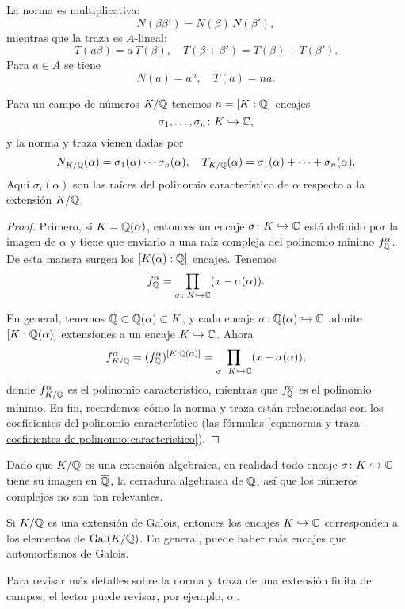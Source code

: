 La norma es multiplicativa:
$$N (\beta \beta') = N (\beta)\,N(\beta'),$$
mientras que la traza es $A$-lineal:
\[ T (a \beta) = a \, T (\beta), \quad
   T (\beta+\beta') = T (\beta) + T (\beta'). \]
Para $a \in A$ se tiene
$$N (a) = a^n, \quad T (a) = na.$$

\begin{proposicion}
  Para un campo de números $K/\mathbb{Q}$ tenemos $n = [K : \mathbb{Q}]$ encajes
  $$\sigma_1,\ldots,\sigma_n\colon K \hookrightarrow \mathbb{C},$$
  y la norma y traza vienen dadas por
  \[ N_{K/\mathbb{Q}} (\alpha) = \sigma_1 (\alpha) \cdots \sigma_n (\alpha), \quad
     T_{K/\mathbb{Q}} (\alpha) = \sigma_1 (\alpha) + \cdots + \sigma_n (\alpha). \]
  Aquí $\sigma_i (\alpha)$ son las raíces del polinomio característico
  de $\alpha$ respecto a la extensión $K/\mathbb{Q}$.

  \begin{proof}
    Primero, si $K = \mathbb{Q} (\alpha)$, entonces un encaje
    $\sigma\colon K \hookrightarrow \mathbb{C}$ está definido por la imagen de
    $\alpha$ y tiene que enviarlo a una raíz compleja del polinomio
    mínimo $f_{\mathbb{Q}}^\alpha$. De esta manera surgen los $[K (\alpha) : \mathbb{Q}]$ encajes.
    Tenemos
    $$f_{\mathbb{Q}}^\alpha = \prod_{\sigma\colon K\hookrightarrow \mathbb{C}} (x - \sigma (\alpha)).$$

    En general, tenemos $\mathbb{Q} \subset \mathbb{Q} (\alpha) \subset K$, y cada
    encaje $\sigma\colon \mathbb{Q} (\alpha) \hookrightarrow \mathbb{C}$ admite
    $[K : \mathbb{Q} (\alpha)]$ extensiones a un encaje $K \hookrightarrow \mathbb{C}$.
    Ahora
    \[ f^\alpha_{K/\mathbb{Q}} = (f^\alpha_{\mathbb{Q}})^{[K : \mathbb{Q} (\alpha)]} =
       \prod_{\sigma\colon K\hookrightarrow \mathbb{C}} (x - \sigma (\alpha)), \]
    donde $f^\alpha_{K/\mathbb{Q}}$ es el polinomio característico, mientras que
    $f^\alpha_{\mathbb{Q}}$ es el polinomio mínimo.
    En fin, recordemos cómo la norma y traza están relacionadas con los
    coeficientes del polinomio característico (las fórmulas
    \eqref{eqn:norma-y-traza-coeficientes-de-polinomio-caracteristico}).
  \end{proof}
\end{proposicion}

\begin{comentario}
  Dado que $K/\mathbb{Q}$ es una extensión algebraica, en realidad todo encaje
  $\sigma\colon K \hookrightarrow \mathbb{C}$ tiene su imagen en $\overline{\mathbb{Q}}$,
  la cerradura algebraica de $\mathbb{Q}$, así que los números complejos no son
  tan relevantes.

  Si $K/\mathbb{Q}$ es una extensión de Galois, entonces los encajes
  $K \hookrightarrow \mathbb{C}$ corresponden a los elementos de $\operatorname{Gal} (K/\mathbb{Q})$.
  En general, puede haber más encajes que automorfismos de Galois.

  Para revisar más detalles sobre la norma y traza de una extensión finita de
  campos, el lector puede revisar, por ejemplo,
  \cite[\S II.8]{Morandi-GTM167} o \cite[\S VI.5]{Lang-Algebra}.
\end{comentario}

